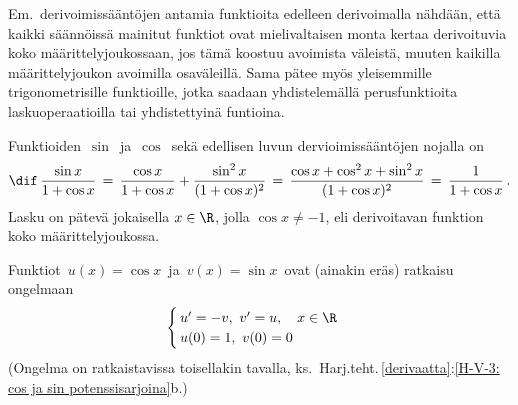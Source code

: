 Em.\ derivoimissääntöjen antamia funktioita edelleen derivoimalla nähdään, että kaikki 
säännöissä mainitut funktiot ovat mielivaltaisen monta kertaa derivoituvia koko
määrittelyjoukossaan, jos tämä koostuu avoimista väleistä, muuten kaikilla määrittelyjoukon
avoimilla osaväleillä. Sama pätee myös yleisemmille trigonometrisille funktioille, jotka
saadaan yhdistelemällä perusfunktioita laskuoperaatioilla tai yhdistettyinä funtioina.
\begin{Exa} Funktioiden $\,\sin\,$ ja $\,\cos\,$ sekä edellisen luvun dervioimissääntöjen
nojalla on
\[
\dif\,\frac{\sin x}{1+\cos x} 
       \,=\, \frac{\cos x}{1+\cos x}+\frac{\sin^2x}{(1+\cos x)^2}
       \,=\, \frac{\cos x+\cos^2x+\sin^2x}{(1+\cos x)^2}
       \,=\, \frac{1}{1+\cos x}\,.
\]
Lasku on pätevä jokaisella $x\in\R$, jolla $\cos x \neq -1$, eli derivoitavan funktion
koko määrittelyjoukossa. \loppu
\end{Exa}
\begin{Exa} Funktiot $\,u(x)=\cos x\,$ ja $\,v(x)=\sin x\,$ ovat (ainakin eräs) ratkaisu
ongelmaan
\[
\begin{cases} \,u'=-v,\ v'=u, \quad x\in\R \\ \,u(0)=1,\ v(0)=0 \end{cases}
\]
(Ongelma on ratkaistavissa toisellakin tavalla, ks.\
Harj.teht.\,\ref{derivaatta}:\ref{H-V-3: cos ja sin potenssisarjoina}b.) \loppu
\end{Exa}
 


